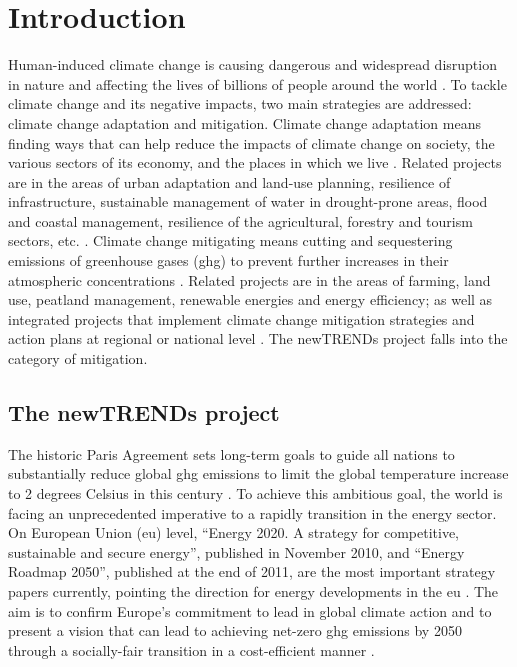 \chapter{Introduction}


Human-induced climate change is causing dangerous and widespread disruption in nature and affecting the lives of billions of people around the world \cite{ipcc}. 
To tackle climate change and its negative impacts, two main strategies are addressed: climate change adaptation and mitigation. 
Climate change adaptation means finding ways that can help reduce the impacts of climate change on society, the various sectors of its economy, and the places in which we live \cite{handbook}. 
Related projects are in the areas of urban adaptation and land-use planning, resilience of infrastructure, sustainable management of water in drought-prone areas, flood and coastal management, resilience of the agricultural, forestry and tourism sectors, etc. \cite{ec}.  
Climate change mitigating means cutting and sequestering emissions of greenhouse gases (\gls{ghg}) to prevent further increases in their atmospheric concentrations \cite{handbook}. 
Related projects are in the areas of farming, land use, peatland management, renewable energies and energy efficiency; as well as integrated projects that implement climate change mitigation strategies and action plans at regional or national level \cite{ec}. 
The newTRENDs project falls into the category of mitigation. 





\section{The newTRENDs project}




The historic Paris Agreement sets long-term goals to guide all nations to substantially reduce global \gls{ghg} emissions to limit the global temperature increase to 2 degrees Celsius in this century \cite{paris}. 
To achieve this ambitious goal, the world is facing an unprecedented imperative to a rapidly transition in the energy sector. 
On European Union (\gls{eu}) level, “Energy 2020. A strategy for competitive, sustainable and secure energy”, published in November 2010, and “Energy Roadmap 2050”, published at the end of 2011, are the most important strategy papers currently, pointing the direction for energy developments in the \gls{eu} \cite{roadmap}. 
The aim is to confirm Europe's commitment to lead in global climate action and to present a vision that can lead to achieving net-zero \gls{ghg} emissions by 2050 through a socially-fair transition in a cost-efficient manner \cite{clean}. 

